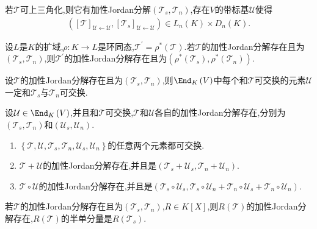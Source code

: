 \begin{proposition}{}{}
	若$\mathcal{T}$可上三角化,则它有加性Jordan分解$\left(\mathcal{T}_{s},\mathcal{T}_{n}\right)$,存在$V$的带标基$\mathcal{U}$使得
	\begin{align*}
		\left(\left[\mathcal{T}\right]_{\mathcal{U}\leftarrow\mathcal{U}},\left[\mathcal{T}_{s}\right]_{\mathcal{U}\leftarrow\mathcal{U}}\right)\in L_{n}\left(K\right)\times D_{n}\left(K\right).
	\end{align*}
\end{proposition}

\begin{corollary}{}{}
	设$L$是$K$的扩域,$\rho:K\to L$是环同态,$\mathcal{T}^{\prime}=\rho^{\ast}\left(\mathcal{T}\right)$.若$\mathcal{T}$的加性Jordan分解存在且为$\left(\mathcal{T}_{s},\mathcal{T}_{n}\right)$,则$\mathcal{T}^{\prime}$的加性Jordan分解存在且为$\left(\rho^{\ast}\left(\mathcal{T}_{s}\right),\rho^{\ast}\left(\mathcal{T}_{n}\right)\right)$.
\end{corollary}

\begin{corollary}{}{}
	设$\mathcal{T}$的加性Jordan分解存在且为$\left(\mathcal{T}_{s},\mathcal{T}_{n}\right)$,则$\End_{K}\left(V\right)$中每个和$\mathcal{T}$可交换的元素$\mathcal{U}$一定和$\mathcal{T}_{s}$与$\mathcal{T}_{n}$可交换.
\end{corollary}

\begin{corollary}{}{}
	设$\mathcal{U}\in\End_{K}\left(V\right)$,并且和$\mathcal{T}$可交换,$\mathcal{T}$和$\mathcal{U}$各自的加性Jordan分解存在,分别为$\left(\mathcal{T}_{s},\mathcal{T}_{n}\right)$和$\left(\mathcal{U}_{s},\mathcal{U}_{n}\right)$.
	\begin{enumerate}
		\item $\left\{\mathcal{T},\mathcal{U},\mathcal{T}_{s},\mathcal{T}_{n},\mathcal{U}_{s},\mathcal{U}_{n}\right\}$的任意两个元素都可交换.
		\item $\mathcal{T}+\mathcal{U}$的加性Jordan分解存在,并且是$\left(\mathcal{T}_{s}+\mathcal{U}_{s},\mathcal{T}_{n}+\mathcal{U}_{n}\right)$.
		\item $\mathcal{T}\circ\mathcal{U}$的加性Jordan分解存在,并且是$\left(\mathcal{T}_{s}\circ\mathcal{U}_{s},\mathcal{T}_{s}\circ\mathcal{U}_{n}+\mathcal{T}_{n}\circ\mathcal{U}_{s}+\mathcal{T}_{n}\circ\mathcal{U}_{n}\right)$.
	\end{enumerate}
\end{corollary}

\begin{corollary}{}{}
	若$\mathcal{T}$的加性Jordan分解存在且为$\left(\mathcal{T}_{s},\mathcal{T}_{n}\right)$,$R\in K\left[X\right]$,则$R\left(\mathcal{T}\right)$的加性Jordan分解存在,$R\left(\mathcal{T}\right)$的半单分量是$R\left(\mathcal{T}_{s}\right)$.
\end{corollary}

